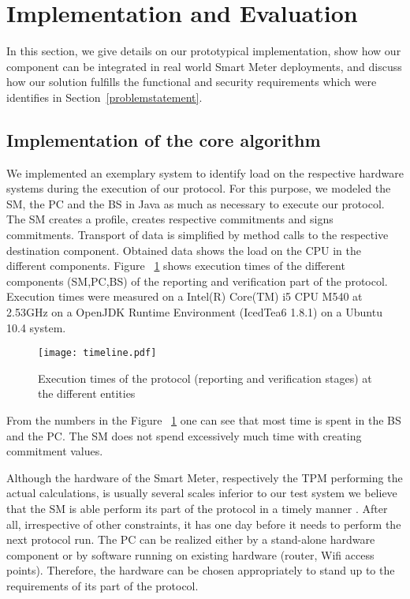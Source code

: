 \documentclass[english]{llncs}
\begin{document}
\section{Implementation and Evaluation}
\label{evaluation}

In this section, we give details on our prototypical implementation, show how our component can be integrated in real world Smart Meter deployments, and discuss how our solution fulfills the functional and security requirements which were identifies in Section~\ref{problemstatement}. 

\subsection{Implementation of the core algorithm}\label{implmentation}

We implemented an exemplary system to identify load on the respective hardware systems during the execution of our protocol. 
For this purpose, we modeled the SM, the PC and the 
BS in Java as much as necessary to execute our protocol. The SM creates a profile, creates respective commitments and signs commitments. Transport of data is simplified by method calls to the respective destination component. Obtained data shows the load on the CPU  in the different components. Figure ~\ref{table:cpuprotocol} shows execution times of the different components (SM,PC,BS) of the reporting and verification part of the protocol. Execution times were measured on a Intel(R) Core(TM) i5 CPU M540 at 2.53GHz on a OpenJDK Runtime Environment (IcedTea6 1.8.1) on a Ubuntu 10.4 system.





\begin{figure}
\texttt{[image: timeline.pdf]}
\caption{Execution times of the protocol (reporting and verification stages) at the different entities}
\label{table:cpuprotocol}
\end{figure}

From the numbers in the Figure ~\ref{table:cpuprotocol} one can see that most time is spent in the BS and the PC. The SM does not spend excessively much time with creating commitment values. 

Although the hardware of the Smart Meter, respectively the TPM performing the actual calculations, is usually several scales inferior to our test system we believe that the SM is able perform its part of the protocol in a timely manner \cite{standardjavacard}.
After all, irrespective of other constraints, it has one day before it needs to perform the next protocol run.
The PC can be realized either by a stand-alone hardware component or by software running on existing hardware (router, Wifi access points). Therefore, the hardware can be chosen appropriately to stand up to the requirements of its part of the protocol.
\end{document}
